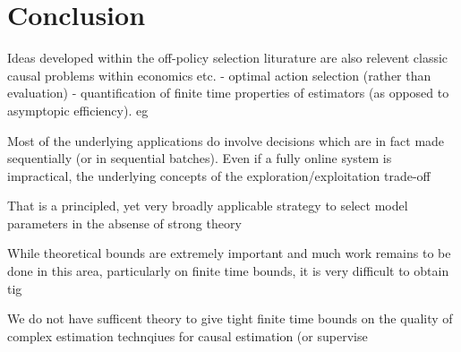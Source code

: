 \section{Conclusion}


Ideas developed within the off-policy selection liturature are also relevent classic causal problems within economics etc.
 - optimal action selection (rather than evaluation)
 - quantification of finite time properties of estimators (as opposed to asymptopic efficiency). eg \cite{}
 

Most of the underlying applications do involve decisions which are in fact made sequentially (or in sequential batches). Even if a fully online system is impractical, the underlying concepts of the exploration/exploitation trade-off  

That is a principled, yet very broadly applicable strategy to select model parameters in the absense of strong theory


While theoretical bounds are extremely important and much work remains to be done in this area, particularly on finite time bounds, it is very difficult to obtain tig


We do not have sufficent theory to give tight finite time bounds on the quality of complex estimation technqiues for causal estimation (or supervise




